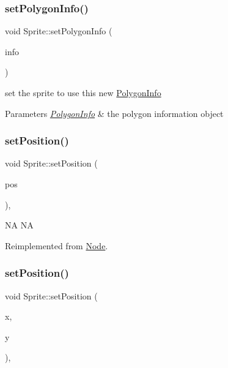 \subsubsection{\texorpdfstring{set\+Polygon\+Info()}{setPolygonInfo()}\hspace{0.1cm}{\footnotesize\ttfamily [2/2]}}
{\footnotesize\ttfamily void Sprite\+::set\+Polygon\+Info (\begin{DoxyParamCaption}\item[{const \hyperlink{classPolygonInfo}{Polygon\+Info} \&}]{info }\end{DoxyParamCaption})}

set the sprite to use this new \hyperlink{classPolygonInfo}{Polygon\+Info}


\begin{DoxyParams}{Parameters}
{\em \hyperlink{classPolygonInfo}{Polygon\+Info}} & the polygon information object \\
\hline
\end{DoxyParams}
\mbox{\label{classSprite_aace7c480af3721709b218bdc579f8903}} 
\subsubsection{\texorpdfstring{set\+Position()}{setPosition()}\hspace{0.1cm}{\footnotesize\ttfamily [1/4]}}
{\footnotesize\ttfamily void Sprite\+::set\+Position (\begin{DoxyParamCaption}\item[{const \hyperlink{classVec2}{Vec2} \&}]{pos }\end{DoxyParamCaption})\hspace{0.3cm}{\ttfamily [override]}, {\ttfamily [virtual]}}

NA  NA 

Reimplemented from \hyperlink{classNode_a8ffbf25763ef5f15eeae7227779505bc}{Node}.

\mbox{\label{classSprite_ad6ceb4be9c4664798908bb0f8dd3bf70}} 
\subsubsection{\texorpdfstring{set\+Position()}{setPosition()}\hspace{0.1cm}{\footnotesize\ttfamily [2/4]}}
{\footnotesize\ttfamily void Sprite\+::set\+Position (\begin{DoxyParamCaption}\item[{float}]{x,  }\item[{float}]{y }\end{DoxyParamCaption})\hspace{0.3cm}{\ttfamily [override]}, {\ttfamily [virtual]}}

